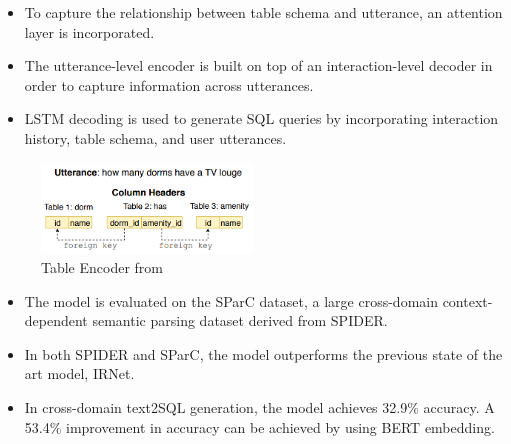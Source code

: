 \begin{itemize}
    \item To capture the relationship between table schema and utterance, an attention layer is incorporated.
    \item The utterance-level encoder is built on top of an interaction-level decoder in order to capture information across utterances.
    \item LSTM decoding is used to generate SQL queries by incorporating interaction history, table schema, and user utterances.
\end{itemize}

\begin{figure}[htb]
    \centering
    \includegraphics[width=0.5\textwidth]{pics/EditSQL/example.png}
    \caption{Table Encoder from \cite{DBLP:journals/corr/abs-1909-00786}}
    \label{fig:EditSQL_example}
\end{figure}

\begin{itemize}
    \item The model is evaluated on the SParC dataset, a large cross-domain context-dependent semantic parsing dataset derived from SPIDER.
    \item In both SPIDER and SParC, the model outperforms the previous state of the art model, IRNet.
    \item In cross-domain text2SQL generation, the model achieves 32.9\% accuracy. A 53.4\% improvement in accuracy can be achieved by using BERT embedding.
\end{itemize}
